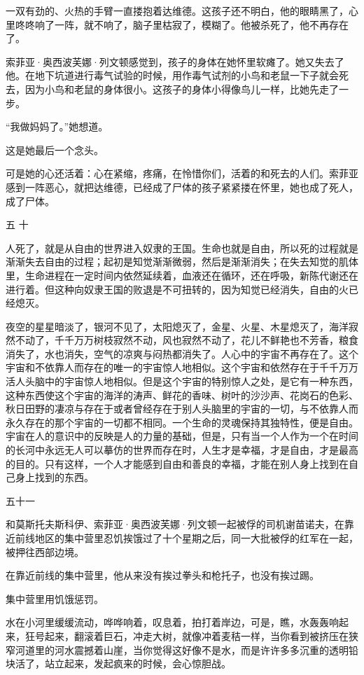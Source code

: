 一双有劲的、火热的手臂一直搂抱着达维德。这孩子还不明白，他的眼睛黑了，心里咚咚响了一阵，就不响了，脑子里枯寂了，模糊了。他被杀死了，他不再存在了。

索菲亚·奥西波芙娜·列文顿感觉到，孩子的身体在她怀里软瘫了。她又失去了他。在地下坑道进行毒气试验的时候，用作毒气试剂的小鸟和老鼠一下子就会死去，因为小鸟和老鼠的身体很小。这孩子的身体小得像鸟儿一样，比她先走了一步。

“我做妈妈了。”她想道。

这是她最后一个念头。

可是她的心还活着：心在紧缩，疼痛，在怜惜你们，活着的和死去的人们。索菲亚感到一阵恶心，就把达维德，已经成了尸体的孩子紧紧搂在怀里，她也成了死人，成了尸体。

五 十

人死了，就是从自由的世界进入奴隶的王国。生命也就是自由，所以死的过程就是渐渐失去自由的过程；起初是知觉渐渐微弱，然后是渐渐消失；在失去知觉的肌体里，生命进程在一定时间内依然延续着，血液还在循环，还在呼吸，新陈代谢还在进行着。但这种向奴隶王国的败退是不可扭转的，因为知觉已经消失，自由的火已经熄灭。

夜空的星星暗淡了，银河不见了，太阳熄灭了，金星、火星、木星熄灭了，海洋寂然不动了，千千万万树枝寂然不动，风也寂然不动了，花儿不鲜艳也不芳香，粮食消失了，水也消失，空气的凉爽与闷热都消失了。人心中的宇宙不再存在了。这个宇宙和不依靠人而存在的唯一的宇宙惊人地相似。这个宇宙和依然存在于千千万万活人头脑中的宇宙惊人地相似。但是这个宇宙的特别惊人之处，是它有一种东西，这种东西使这个宇宙的海洋的涛声、鲜花的香味、树叶的沙沙声、花岗石的色彩、秋日田野的凄凉与存在于或者曾经存在于别人头脑里的宇宙的一切，与不依靠人而永久存在的那个宇宙的一切都不相同。一个生命的灵魂保持其独特性，便是自由。宇宙在人的意识中的反映是人的力量的基础，但是，只有当一个人作为一个在时间的长河中永远无人可以摹仿的世界而存在时，人生才是幸福，才是自由，才是最高的目的。只有这样，一个人才能感到自由和善良的幸福，才能在别人身上找到在自己身上找到的东西。

五十一

和莫斯托夫斯科伊、索菲亚·奥西波芙娜·列文顿一起被俘的司机谢苗诺夫，在靠近前线地区的集中营里忍饥挨饿过了十个星期之后，同一大批被俘的红军在一起，被押往西部边境。

在靠近前线的集中营里，他从来没有挨过拳头和枪托子，也没有挨过踢。

集中营里用饥饿惩罚。

水在小河里缓缓流动，哗哗响着，叹息着，拍打着岸边，可是，瞧，水轰轰响起来，狂号起来，翻滚着巨石，冲走大树，就像冲着麦秸一样，当你看到被挤压在狭窄河道里的河水震撼着山崖，当你觉得这好像不是水，而是许许多多沉重的透明铅块活了，站立起来，发起疯来的时候，会心惊胆战。

